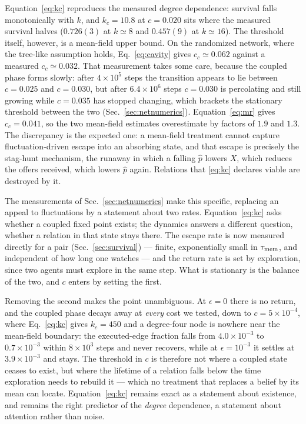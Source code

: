 \documentclass[aps,pre,twocolumn,superscriptaddress,floatfix,longbibliography]{revtex4-2}
\begin{document}
Equation~\eqref{eq:kc} reproduces the measured degree dependence: survival falls
monotonically with $k$, and $k_c=10.8$ at $c=0.020$ sits where the measured
survival halves ($0.726(3)$ at $k\simeq8$ and $0.457(9)$ at
$k\simeq16$). The threshold itself, however, is a mean-field upper bound. On
the randomized network, where the tree-like assumption holds,
Eq.~\eqref{eq:cavity} gives $c_c\simeq0.062$ against a measured
$c_c\simeq0.032$. That measurement takes some care, because the coupled
phase forms slowly: after $4\times10^{5}$ steps the transition appears to lie
between $c=0.025$ and $c=0.030$, but after $6.4\times10^{6}$ steps $c=0.030$ is
percolating and still growing while $c=0.035$ has stopped changing, which
brackets the stationary threshold between the two (Sec.~\ref{sec:netnumerics}).
Equation~\eqref{eq:mr} gives $c_c=0.041$, so the two mean-field estimates
overestimate by factors of $1.9$ and $1.3$. The
discrepancy is the
expected one: a mean-field treatment cannot capture fluctuation-driven escape
into an absorbing state, and that escape is precisely the stag-hunt mechanism,
the runaway in which a falling $\hat p$ lowers $X$, which reduces the offers
received, which lowers $\hat p$ again. Relations that \eqref{eq:kc} declares
viable are destroyed by it.

The measurements of Sec.~\ref{sec:netnumerics} make this specific,
replacing an appeal to fluctuations by a statement about two rates.
Equation~\eqref{eq:kc} asks whether a coupled fixed point exists; the dynamics
answers a different question, whether a relation in that state stays there. The
escape rate is now measured directly for a pair (Sec.~\ref{sec:survival}) ---
finite, exponentially small in $\tau_{\rm mem}$, and independent of how long one
watches --- and the return rate is set by exploration, since two agents must
explore in the same step. What is stationary is the balance of the two, and $c$
enters by setting the first.

Removing the second makes the point unambiguous. At $\epsilon=0$ there is no
return, and the coupled phase decays away at \emph{every} cost we tested, down to
$c=5\times10^{-4}$, where Eq.~\eqref{eq:kc} gives $k_c=450$ and a degree-four
node is nowhere near the mean-field boundary: the executed-edge fraction falls
from $4.0\times10^{-3}$ to $0.7\times10^{-3}$ within $8\times10^{3}$ steps and
never recovers, while at $\epsilon=10^{-3}$ it settles at $3.9\times10^{-3}$ and
stays. The threshold in $c$ is therefore not where a coupled state ceases to
exist, but where the lifetime of a relation falls below the time exploration
needs to rebuild it --- which no treatment that replaces a belief by its mean can
locate. Equation~\eqref{eq:kc} remains exact as a statement about existence, and
remains the right predictor of the \emph{degree} dependence, a statement about
attention rather than noise.
\end{document}
